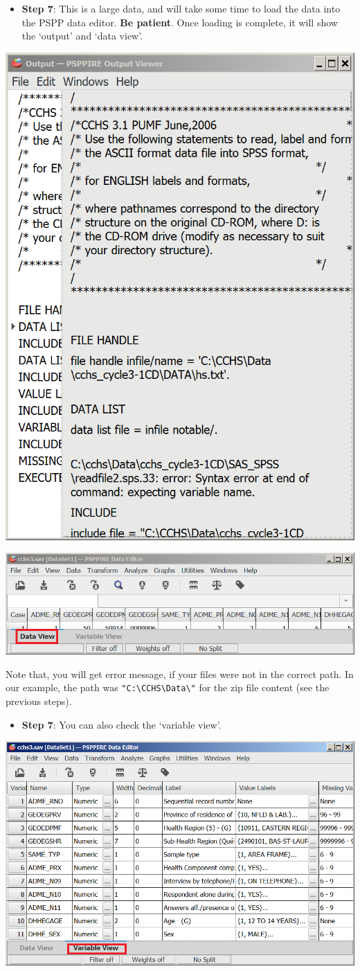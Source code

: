 \documentclass[
]{book}
\providecommand{\tightlist}{%
  \setlength{\itemsep}{0pt}\setlength{\parskip}{0pt}}
\begin{document}
\begin{itemize}
\tightlist
\item
  \textbf{Step 7}: This is a large data, and will take some time to load the data into the PSPP data editor. \textbf{Be patient}. Once loading is complete, it will show the `output' and `data view'.
\end{itemize}

\includegraphics[width=0.65\linewidth]{images/abacusNew}

\includegraphics[width=0.65\linewidth]{images/abacus36}

Note that, you will get error message, if your files were not in the correct path. In our example, the path was \texttt{"C:\textbackslash{}CCHS\textbackslash{}Data\textbackslash{}"} for the zip file content (see the previous steps).

\begin{itemize}
\tightlist
\item
  \textbf{Step 7}: You can also check the `variable view'.
\end{itemize}

\includegraphics[width=0.65\linewidth]{images/abacus37}
\end{document}
